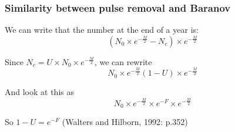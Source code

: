 \documentclass{beamer}
\begin{document}
\begin{frame}
  \frametitle{Similarity between pulse removal and Baranov}

  We can write that the number at the end of a year is:
  \begin{equation}
    (N_{0} \times e^{-\frac{M}{2}} - N_{c}) \times e^{-\frac{M}{2}}
    \end{equation}

  Since $N_{c} = U \times N_{0} \times e^{-\frac{M}{2}}$, we can rewrite
   \begin{equation}
    N_{0} \times e^{-\frac{M}{2}} (1-U) \times e^{-\frac{M}{2}}
    \end{equation}

   And look at this as
     \begin{equation}
    N_{0} \times e^{-\frac{M}{2}} \times e^{-F} \times e^{-\frac{M}{2}}
     \end{equation}

     So $1-U = e^{-F}$ (Walters and Hilborn, 1992: p.352)
 
  
  \end{frame}
\end{document}
